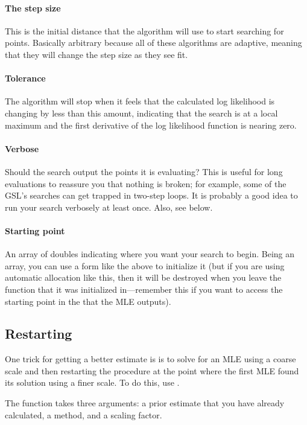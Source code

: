 \paragraph{The step size} This is the initial distance that the
algorithm will use to start searching for points. Basically arbitrary
because all of these algorithms are adaptive, meaning that they will
change the step size as they see fit.

\paragraph{Tolerance} The algorithm will stop when it feels
that the calculated log likelihood is changing by less than this amount,
indicating that the search is at a local maximum and the first derivative of
the log likelihood function is nearing zero.

\paragraph{Verbose} Should the search output the points it is evaluating?
This is useful for long evaluations to reassure you that nothing is
broken; for example, some of the GSL's searches can get trapped in two-step loops.
It is probably a good idea to run your search verbosely at least once.
Also, see  below.

\paragraph{Starting point} An array of doubles indicating where you want
your search to begin. Being an array, you can use a form like the above
to initialize it (but if you are using automatic allocation like this, then it will be destroyed when you leave the
function that it was initialized in---remember this if you want to
access the starting point in the  that the MLE outputs).


\subsection{Restarting} 
\label{restart} One trick for getting a better estimate is is to solve
for an MLE using a coarse scale and then restarting the procedure at
the point where the first MLE found its solution using a finer scale.
To do this, use .

The function takes three arguments: a prior estimate that you have
already calculated, a method, and a scaling factor. 

